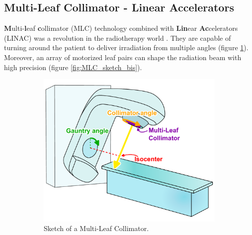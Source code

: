 \subsection[MLC-LINAC]{Multi-Leaf Collimator - Linear Accelerators}
\textbf{M}ulti-\textbf{l}eaf \textbf{c}ollimator (MLC) technology combined with \textbf{Lin}ear \textbf{Ac}celerators (LINAC) was a revolution in the radiotherapy world \cite{Bakiu2013} \cite{Xu2017}.
They are capable of turning around the patient to deliver irradiation from multiple angles (figure \ref{fig:MLC_sketch}).
Moreover, an array of motorized leaf pairs can shape the radiation beam with high precision (figure \ref{fig:MLC_sketch_bis}).
\begin{figure}
	\centering
	\begin{subfigure}[b]{0.55\textwidth}
		\centering
		\includegraphics[width=\textwidth]{MLC_sketch.pdf}
		\caption{Sketch of a Multi-Leaf Collimator.}
		\label{fig:MLC_sketch}
	\end{subfigure}
	\hfill
	\begin{subfigure}[b]{0.35\textwidth}
		\centering

\end{subfigure}
\end{figure}
